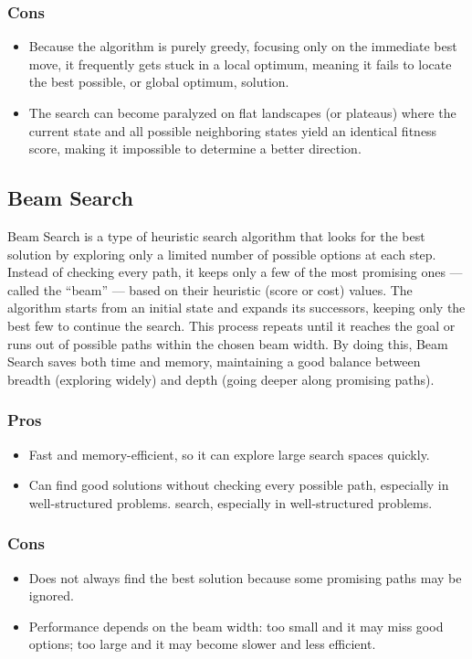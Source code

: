 \documentclass[conference]{IEEEtran}
\begin{document}
\subsubsection{Cons}
\begin{itemize}
    \item Because the algorithm is purely greedy, focusing only on the immediate best move, it frequently gets stuck in a local optimum, meaning it fails to locate the best possible, or global optimum, solution.
    \item The search can become paralyzed on flat landscapes (or plateaus) where the current state and all possible neighboring states yield an identical fitness score, making it impossible to determine a better direction. 
\end{itemize}
\subsection{Beam Search}
Beam Search is a type of heuristic search algorithm that looks for the best solution by exploring only a limited number of possible options at each step. Instead of checking every path, it keeps only a few of the most promising ones — called the “beam” — based on their heuristic (score or cost) values. The algorithm starts from an initial state and expands its successors, keeping only the best few to continue the search. This process repeats until it reaches the goal or runs out of possible paths within the chosen beam width. By doing this, Beam Search saves both time and memory, maintaining a good balance between breadth (exploring widely) and depth (going deeper along promising paths).
\subsubsection{Pros}
\begin{itemize}
    \item Fast and memory-efficient, so it can explore large search spaces quickly.
    \item Can find good solutions without checking every possible path, especially in well-structured problems. search, especially in well-structured problems.
\end{itemize}
\subsubsection{Cons}
\begin{itemize}
    \item Does not always find the best solution because some promising paths may be ignored.
    \item Performance depends on the beam width: too small and it may miss good options; too large and it may become slower and less efficient.
\end{itemize} 
\end{document}
